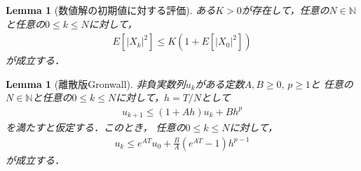\documentclass[dvipdfmx,autodetect-engine]{jsarticle}
\newtheorem{lemma}[theorem]{Lemma}
\theoremstyle{remark}
\theoremstyle{definition}
\newcommand{\N}{\mathbb{N}}
\newcommand{\abs}[1]{\left\lvert#1\right\rvert}
\begin{document}
\begin{lemma}[数値解の初期値に対する評価]
    ある$K>0$が存在して，任意の$N \in \N$と任意の$0\leq k\leq N$に対して，
    \begin{align}
        E[\abs{X_{k}}^{2}] \leq K(1+E[\abs{X_{0}}^{2}])
    \end{align}
    が成立する．
\end{lemma}


\begin{lemma}[離散版Gronwall]
    非負実数列$u_{k}$がある定数$A,B\geq 0,\,p\geq 1$と
    任意の$N \in \N$と任意の$0\leq k\leq N$に対して，$h = T/N$として
    \begin{align}
        u_{k+1} \leq (1+Ah)u_{k} + Bh^{p}
    \end{align}
    を満たすと仮定する．このとき，
    任意の$0\leq k\leq N$に対して，
    \begin{align}
        u_{k} \leq e^{AT}u_{0} + \frac{B}{A}(e^{AT}-1)h^{p-1}
    \end{align}
    が成立する．
\end{lemma}
\end{document}
